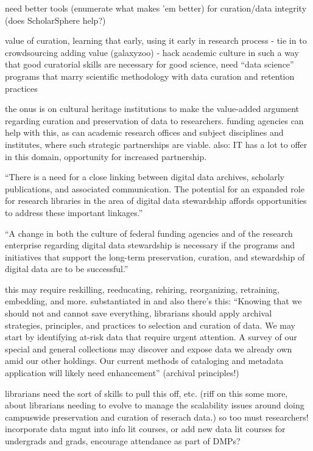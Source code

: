 \documentclass{acm_proc_article-sp}
\begin{document}
need better tools (enumerate what makes 'em better) for curation/data
integrity (does ScholarSphere help?)

value of curation, learning that early, using it early in research process -
tie in to crowdsourcing adding value (galaxyzoo) - hack academic culture in
such a way that good curatorial skills are necessary for good science, need
``data science'' programs that marry scientific methodology with data curation
and retention practices

the onus is on cultural heritage institutions to make the value-added
argument regarding curation and preservation of data to researchers.
funding agencies can help with this, as can academic research offices
and subject disciplines and institutes, where such strategic
partnerships are viable.  also: IT has a lot to offer in this domain,
opportunity for increased partnership.

``There is a need for a close linking between digital data archives,
scholarly publications, and associated communication. The potential
for an expanded role for research libraries in the area of digital
data stewardship affords opportunities to address these important
linkages.'' \cite{arl:stewardship}

``A change in both the culture of federal funding agencies
and of the research enterprise regarding digital data stewardship is
necessary if the programs and initiatives that support the long-term
preservation, curation, and stewardship of digital data are to be
successful.'' \cite{arl:stewardship}

this may require reskilling, reeducating, rehiring, reorganizing,
retraining, embedding, and more. substantiated in \cite{jisc:deluge}
and also there's this: ``Knowing that we should not and cannot save
everything, librarians should apply archival strategies, principles,
and practices to selection and curation of data. We may start by
identifying at-risk data that require urgent attention. A survey of
our special and general collections may discover and expose data we
already own amid our other holdings. Our current methods of cataloging
and metadata application will likely need enhancement''
\cite{ogburn:imperative} (archival principles!)

librarians need the sort of skills to pull this off, etc. (riff on
this some more, about librarians needing to evolve to manage the
scalability issues around doing campuswide preservation and curation
of reserach data.) so too must researchers!  incorporate data mgmt
into info lit courses, or add new data lit courses for undergrads and
grads, encourage attendance as part of DMPs?
\end{document}
